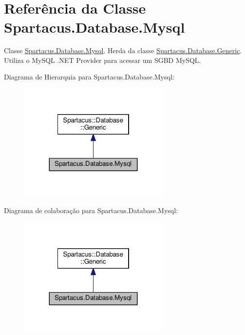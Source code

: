 \hypertarget{classSpartacus_1_1Database_1_1Mysql}{\section{Referência da Classe Spartacus.\+Database.\+Mysql}
\label{classSpartacus_1_1Database_1_1Mysql}
}


Classe \hyperlink{classSpartacus_1_1Database_1_1Mysql}{Spartacus.\+Database.\+Mysql}. Herda da classe \hyperlink{classSpartacus_1_1Database_1_1Generic}{Spartacus.\+Database.\+Generic}. Utiliza o My\+S\+Q\+L .N\+E\+T Provider para acessar um S\+G\+B\+D My\+S\+Q\+L.  




Diagrama de Hierarquia para Spartacus.\+Database.\+Mysql\+:\nopagebreak
\begin{figure}[H]
\begin{center}
\leavevmode
\includegraphics[width=215pt]{classSpartacus_1_1Database_1_1Mysql__inherit__graph}
\end{center}
\end{figure}


Diagrama de colaboração para Spartacus.\+Database.\+Mysql\+:\nopagebreak
\begin{figure}[H]
\begin{center}
\leavevmode
\includegraphics[width=215pt]{classSpartacus_1_1Database_1_1Mysql__coll__graph}
\end{center}
\end{figure}

